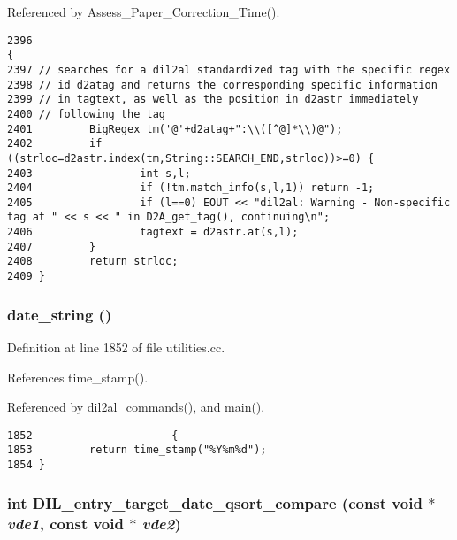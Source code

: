 Referenced by Assess\_\-Paper\_\-Correction\_\-Time().



\footnotesize\begin{verbatim}2396                                                                               {
2397 // searches for a dil2al standardized tag with the specific regex
2398 // id d2atag and returns the corresponding specific information
2399 // in tagtext, as well as the position in d2astr immediately
2400 // following the tag
2401         BigRegex tm('@'+d2atag+":\\([^@]*\\)@");
2402         if ((strloc=d2astr.index(tm,String::SEARCH_END,strloc))>=0) {
2403                 int s,l;
2404                 if (!tm.match_info(s,l,1)) return -1;
2405                 if (l==0) EOUT << "dil2al: Warning - Non-specific tag at " << s << " in D2A_get_tag(), continuing\n";
2406                 tagtext = d2astr.at(s,l);
2407         }
2408         return strloc;
2409 }
\end{verbatim}\normalsize 
{}
\subsubsection{ date\_\-string ()}\label{utilities_8cc_a22}




Definition at line 1852 of file utilities.cc.

References time\_\-stamp().

Referenced by dil2al\_\-commands(), and main().



\footnotesize\begin{verbatim}1852                      {
1853         return time_stamp("%Y%m%d");
1854 }
\end{verbatim}\normalsize 
{}
\subsubsection{\setlength{\rightskip}{0pt plus 5cm}int DIL\_\-entry\_\-target\_\-date\_\-qsort\_\-compare (const void $\ast$ {\em vde1}, const void $\ast$ {\em vde2})}\label{utilities_8cc_a14}




